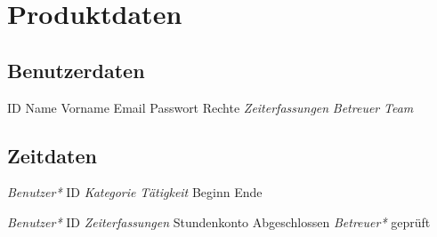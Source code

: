 \section{Produktdaten}

\subsection{Benutzerdaten}
\begin{requirements}
	\begin{requirements}
		 ID
		 Name
		 Vorname
		 Email
		 Passwort
		 Rechte
		 \emph{Zeiterfassungen}
		 \emph{Betreuer}
		 \emph{Team}
	\end{requirements}
\end{requirements}

\subsection{Zeitdaten}
\begin{requirements}
	\req [Zeiterfassung] {D20}
	\begin{requirements}
		 \emph{Benutzer*} ID
		 \emph{Kategorie}
		 \emph{Tätigkeit}
		 Beginn
		 Ende
	\end{requirements}

	\req [Stundenzettel] {D30}
	\begin{requirements}
		 \emph{Benutzer*} ID
		 \emph{Zeiterfassungen}
		 Stundenkonto
		 Abgeschlossen
		 \emph{Betreuer*} geprüft
	\end{requirements}
\end{requirements}



